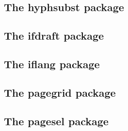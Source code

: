 \documentclass[a4paper,12pt]{article}
\makeatletter
\newcommand*{\xpackage}[1]{\textsf{#1}}
\newcommand*{\xoption}[1]{\textsf{#1}}
\newcommand*{\cs}[1]{\texttt{\textbackslash#1}}
\newcommand*{\tocinclude}[1]{%
  \setcounter{tocdepth}{3}%
  \begingroup
    \makeatletter
    \def\@prj{#1}%
    \let\contentsline\foreign@contentsline
  \endgroup
}
\def\foreign@contentsline#1#2#3#4{%
  \ifx\\#4\\%
    \csname l@#1\endcsname{#2}{#3}%
  \else
    \ifHy@linktocpage
      \csname l@#1\endcsname{{#2}}{%
        \hyper@linkfile{#3}{\@prj.pdf}{#4}%
      }%
    \else
      \csname l@#1\endcsname{%
        \hyper@linkfile{#2}{\@prj.pdf}{#4}%
      }{#3}%
    \fi
  \fi
}%
\newcommand*{\pkgsectformat}[1]{%
  \texorpdfstring{%
    \textcolor{link}{The} %
    \xpackage{#1} %
    \textcolor{link}{package}%
  }{#1}%
}
\makeatother
\begin{document}
\newpage
\subsection{\pkgsectformat{hyphsubst}}
\label{hyphsubst}
\begin{abstract}
A \TeX\ format file may include alternative hyphenation patterns
for a language with a different name. If the naming convention
follows \xpackage{babel's} rules, then the hyphenation patterns
for a language can be replaced by the alternative hyphenation patterns,
provided in the format file.
\end{abstract}
\tocinclude{hyphsubst}

\newpage
\subsection{\pkgsectformat{ifdraft}}
\label{ifdraft}
\begin{abstract}
The package provides an interface for selecting code depending
on the options \xoption{draft} and \xoption{final}.
\end{abstract}
\tocinclude{ifdraft}

\newpage
\subsection{\pkgsectformat{iflang}}
\label{iflang}
\begin{abstract}
This package provides expandible checks for the current language
based on macro \cs{languagename} or hyphenation patterns.
\end{abstract}
\tocinclude{iflang}

\newpage
\subsection{\pkgsectformat{pagegrid}}
\label{pagegrid}
\begin{abstract}
The \LaTeX\ package prints a page grid in the background.
\end{abstract}
\tocinclude{pagegrid}

\newpage
\subsection{\pkgsectformat{pagesel}}
\label{pagesel}
\begin{abstract}
Single pages or page areas can be selected for output.
\end{abstract}
\tocinclude{pagesel}
\end{document}
